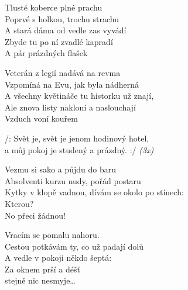
\ve{}
Tlusté koberce plné prachu\\
Poprvé s holkou, trochu strachu\\
A stará dáma od vedle zas vyvádí\\
Zbyde tu po ní zvadlé kapradí\\
A pár prázdných flašek

\ve{}
Veterán z legií nadává na revma\\
Vzpomíná na Evu, jak byla nádherná\\
A všechny květináče tu historku už znají,\\
Ale znova listy nakloní a naslouchají\\
Vzduch voní kouřem

\cho{}
/: Svět je, svět je jenom hodinový hotel,\\
a můj pokoj je studený a prázdný. :/ \textit{(3x)}

\ve{}
Vezmu si sako a půjdu do baru\\
Absolventi kurzu nudy, pořád postaru\\
Kytky v klopě vadnou, dívám se okolo po stínech:\\
Kterou?\\
No přeci žádnou!

\ve{}
Vracím se pomalu nahoru.\\
Cestou potkávám ty, co už padají dolů\\
A vedle v pokoji někdo šeptá: \\
Za oknem prší a déšť\\
stejně nic nesmyje\ldots

\cho{}

\esong